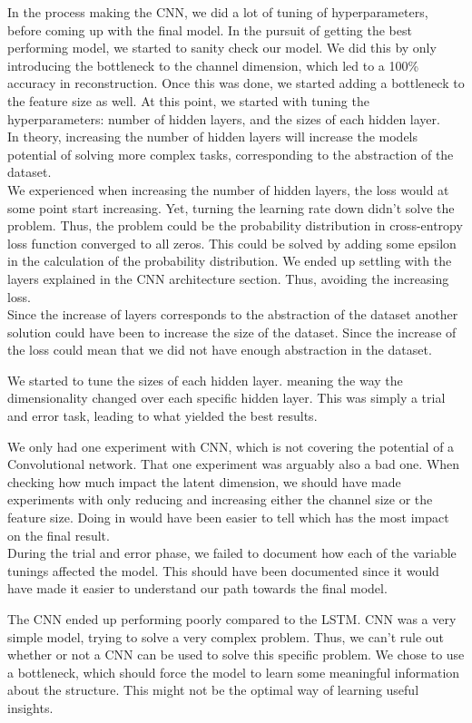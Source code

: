 In the process making the CNN, we did a lot of tuning of hyperparameters, before coming up with the final model. In the pursuit of getting the best performing model, we started to sanity check our model. We did this by only introducing the bottleneck to the channel dimension, which led to a 100\% accuracy in reconstruction. Once this was done, we started adding a bottleneck to the feature size as well. At this point, we started with tuning the hyperparameters: number of hidden layers, and the sizes of each hidden layer. \\

\noindent
In theory, increasing the number of hidden layers will increase the models potential of solving more complex tasks, corresponding to the abstraction of the dataset.\\

\noindent
We experienced when increasing the number of hidden layers, the loss would at some point start increasing. Yet, turning the learning rate down didn't solve the problem. Thus, the problem could be the probability distribution in cross-entropy loss function converged to all zeros. This could be solved by adding some epsilon in the calculation of the probability distribution. We ended up settling with the layers explained in the CNN architecture section. Thus, avoiding the increasing loss. \\

\noindent
Since the increase of layers corresponds to the abstraction of the dataset another solution could have been to increase the size of the dataset. Since the increase of the loss could mean that we did not have enough abstraction in the dataset.

\noindent
We started to tune the sizes of each hidden layer. meaning the way the dimensionality changed over each specific hidden layer. This was simply a trial and error task, leading to what yielded the best results.

\noindent
We only had one experiment with CNN, which is not covering the potential of a Convolutional network. That one experiment was arguably also a bad one. When checking how much impact the latent dimension, we should have made experiments with only reducing and increasing either the channel size or the feature size. Doing in would have been easier to tell which has the most impact on the final result. \\

\noindent
During the trial and error phase, we failed to document how each of the variable tunings affected the model. This should have been documented since it would have made it easier to understand our path towards the final model.

\noindent
The CNN ended up performing poorly compared to the LSTM. CNN was a very simple model, trying to solve a very complex problem. Thus, we can't rule out whether or not a CNN can be used to solve this specific problem. We chose to use a bottleneck, which should force the model to learn some meaningful information about the structure. This might not be the optimal way of learning useful insights.
